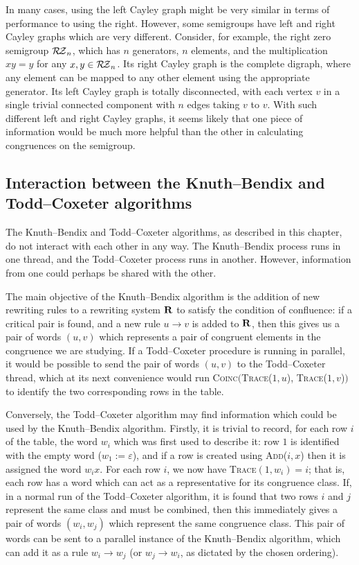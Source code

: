 In many cases, using the left Cayley graph might be very similar in terms of
performance to using the right.  However, some semigroups have left and right
Cayley graphs which are very different.  Consider, for example, the right zero
semigroup $\mathcal{R\!Z}_n$, which has $n$ generators, $n$ elements, and the
multiplication $xy=y$ for any $x,y \in \mathcal{R\!Z}_n$.  Its right Cayley graph is the
complete digraph, where any element can be mapped to any other element using the
appropriate generator.  Its left Cayley graph is totally disconnected, with each
vertex $v$ in a single trivial connected component with $n$ edges taking $v$ to
$v$.  With such different left and right Cayley graphs, it seems likely that one
piece of information would be much more helpful than the other in calculating
congruences on the semigroup.

\subsection{Interaction between the Knuth--Bendix and Todd--Coxeter algorithms}
\label{sec:linking-kb-tc}
The Knuth--Bendix and Todd--Coxeter algorithms, as described in this chapter, do
not interact with each other in any way.  The Knuth--Bendix process runs in one
thread, and the Todd--Coxeter process runs in another.  However, information from
one could perhaps be shared with the other.

The main objective of the Knuth--Bendix algorithm is the addition of new rewriting rules to a
rewriting system $\mathbf{R}$ to satisfy the condition of confluence: if a critical
pair is found, and a new rule $u \to v$ is added to $\mathbf{R}$, then this gives us a
pair of words $(u,v)$ which represents a pair of congruent elements in the congruence we
are studying.  If a Todd--Coxeter procedure is running in parallel, it would be
possible to send the pair of words $(u,v)$ to the Todd--Coxeter thread, which
at its next convenience would run \textsc{Coinc$\big($Trace($1, u$), Trace($1, v$)$\big)$}
to identify the two corresponding rows in the table.

Conversely, the Todd--Coxeter algorithm may find information which could be used by
the Knuth--Bendix algorithm.  Firstly, it is trivial to record, for each row $i$ of the table,
the word $w_i$ which was first used to describe it: row $1$ is identified with
the empty word ($w_1 := \varepsilon$), and if a row is created using
\textsc{Add($i, x$)} then it is assigned the word $w_ix$.  For each row $i$, we
now have \textsc{Trace}$(1, w_i) = i$; that is, each row has a word which can
act as a representative for its congruence class.
If, in a normal run of the Todd--Coxeter algorithm, it is found that two rows $i$ and $j$
represent the same class and must be combined, then this immediately gives a
pair of words $(w_i,w_j)$ which represent the same congruence class.  This pair
of words can be sent to a parallel instance of the Knuth--Bendix algorithm, which can add it as
a rule $w_i \to w_j$ (or $w_j \to w_i$, as dictated by the chosen ordering).

